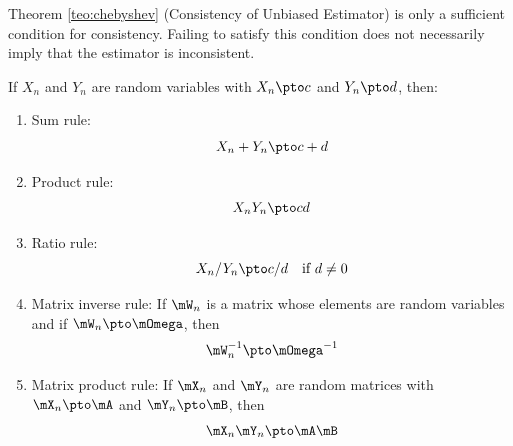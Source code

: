 \documentclass[english,12pt]{book}\usepackage[]{graphicx}\usepackage[]{xcolor}
\begin{document}
\begin{remark}
Theorem \ref{teo:chebyshev} (Consistency of Unbiased Estimator) is only a sufficient condition for consistency. Failing to satisfy this condition does not necessarily imply that the estimator is inconsistent. 
\end{remark}


\begin{theorem}\label{teo:rules_pto}
  If $X_n$ and $Y_n$ are random variables with $X_n \pto c$ and $Y_n\pto d$, then:
  
  \begin{enumerate}
    \item Sum rule:
        \begin{equation}
            X_n + Y_n \pto c + d
        \end{equation}
    \item Product rule:
        \begin{equation}
            X_nY_n \pto cd
        \end{equation}
    \item Ratio rule:
        \begin{equation}
            X_n/Y_n \pto c/d \quad \mbox{if $d\neq 0$}
        \end{equation}
    \item Matrix inverse rule: If $\mW_n$ is a matrix whose elements are random variables and if $\mW_n\pto \mOmega$, then
        \begin{equation}
          \mW_n^{-1}\pto \mOmega^{-1}
        \end{equation}
    \item Matrix product rule: If $\mX_n$ and $\mY_n$ are random matrices with $\mX_n\pto \mA$ and $\mY_n\pto \mB$, then
        \begin{equation}
          \mX_n\mY_n\pto \mA\mB
        \end{equation}
  \end{enumerate}
\end{theorem}
\end{document}
